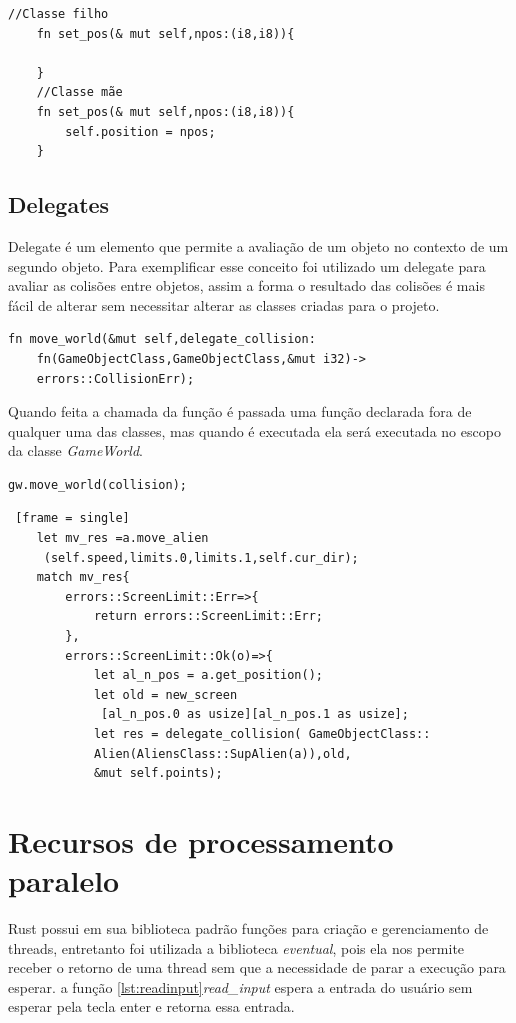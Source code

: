 \documentclass[rel_mlp]{iiufrgs}
\begin{document}
 \begin{lstlisting}[frame=single]
    //Classe filho
    fn set_pos(& mut self,npos:(i8,i8)){
        
    }
    //Classe mãe
    fn set_pos(& mut self,npos:(i8,i8)){
        self.position = npos;
    }
 \end{lstlisting}
 
 \section{Delegates}
Delegate é um elemento que permite a avaliação de um objeto no contexto de um segundo objeto. Para exemplificar esse conceito foi utilizado um delegate para avaliar as colisões entre objetos, assim a forma o resultado das colisões é mais fácil de alterar sem necessitar alterar as classes criadas para o projeto.
\begin{lstlisting}[frame= single]
    fn move_world(&mut self,delegate_collision:
    fn(GameObjectClass,GameObjectClass,&mut i32)->
    errors::CollisionErr);
\end{lstlisting}
Quando feita a chamada da função é passada uma função declarada fora de qualquer uma das classes, mas quando é executada ela será executada no escopo da classe \textit{GameWorld}.
\begin{lstlisting}[frame = single]
    gw.move_world(collision);

\end{lstlisting}
 
 \begin{lstlisting} [frame = single]
    let mv_res =a.move_alien
     (self.speed,limits.0,limits.1,self.cur_dir);
    match mv_res{
        errors::ScreenLimit::Err=>{
            return errors::ScreenLimit::Err;        
        },
        errors::ScreenLimit::Ok(o)=>{
            let al_n_pos = a.get_position();
            let old = new_screen
             [al_n_pos.0 as usize][al_n_pos.1 as usize];
            let res = delegate_collision( GameObjectClass::
            Alien(AliensClass::SupAlien(a)),old,
            &mut self.points);
 \end{lstlisting}
 
 \chapter{Recursos de processamento paralelo}   
 Rust possui em sua biblioteca padrão funções para criação e gerenciamento de threads, entretanto foi utilizada a biblioteca \textit{eventual}, pois ela nos permite receber o retorno de uma thread sem que a necessidade de parar a execução para esperar. a função \ref{lst:readinput}\textit{read\_input} espera a entrada do usuário sem esperar pela tecla enter e retorna essa entrada.
 
\end{document}
